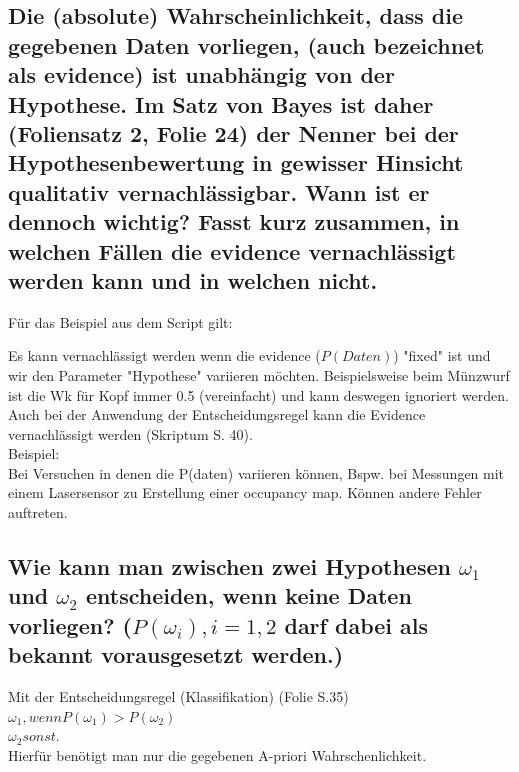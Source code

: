 \documentclass{scrartcl}
\begin{document}
\subsection{Die (absolute) Wahrscheinlichkeit, dass die gegebenen Daten vorliegen, (auch bezeichnet als evidence) ist unabhängig von der Hypothese. Im Satz von Bayes ist daher (Foliensatz 2, Folie 24) der Nenner bei der Hypothesenbewertung in gewisser Hinsicht qualitativ vernachlässigbar. Wann ist er dennoch wichtig? Fasst kurz zusammen, in welchen Fällen die evidence vernachlässigt werden kann und in welchen nicht.}
Für das Beispiel aus dem Script gilt: 

Es kann vernachlässigt werden wenn die evidence ($P(Daten)$) "fixed" ist und wir den Parameter "Hypothese" variieren möchten. Beispielsweise beim Münzwurf ist die Wk für Kopf immer 0.5 (vereinfacht) und kann deswegen ignoriert werden. Auch  bei der Anwendung der Entscheidungsregel kann die Evidence vernachlässigt werden (Skriptum S. 40).\\
Beispiel:\\Bei Versuchen in denen die P(daten) variieren können, Bspw. bei Messungen mit einem Lasersensor zu Erstellung einer occupancy map. Können andere Fehler auftreten. \\

\subsection{Wie kann man zwischen zwei Hypothesen $\omega_1$ und $\omega_2$ entscheiden, wenn keine Daten vorliegen? ($P(\omega_i), i=1,2$ darf dabei als bekannt vorausgesetzt werden.)}
Mit der Entscheidungsregel (Klassifikation) (Folie S.35) \\
$\omega_1, wenn P(\omega_1 ) > P(\omega_2) $ \\
$\omega_2 sonst.$\\
Hierfür benötigt man nur die gegebenen A-priori Wahrschenlichkeit. \\
\end{document}
